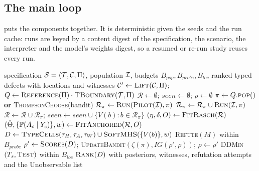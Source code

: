 \subsection{The main loop}

 puts the components together. It is deterministic given the seeds and the run cache: runs are keyed by a content digest of the specification, the scenario, the interpreter and the model's weights digest, so a resumed or re-run study reuses every run.

\begin{algorithm}[t]
\caption{\specdx}
\label{alg:specdx}
\small
\begin{algorithmic}[1]
\Require specification $\mathcal{S}=\langle\mathcal{T},\mathcal{C},\Pi\rangle$, population $\mathcal{I}$, budgets $B_{\textit{pop}},B_{\textit{probe}},B_{\textit{loc}}$
\Ensure ranked typed defects with locations and witnesses
\State $\mathcal{C}'\gets\textsc{Lift}(\mathcal{C},\Pi)$;\; $Q\gets\textsc{Reference}(\Pi)\cdot\textsc{TBoundary}(\mathcal{T},\Pi)$
\State $\mathcal{R}\gets\emptyset$;\; $\textit{seen}\gets\emptyset$;\; $\rho\gets\emptyset$ 
  \State $\pi\gets Q.\textsc{pop}()$ \textbf{or} \textsc{ThompsonChoose}(bandit)
  \State $\mathcal{R}_\pi\gets\textsc{Run}(\textsc{Pilot}(\mathcal{I}),\pi)$
    \State $\mathcal{R}_\pi\gets\mathcal{R}_\pi\cup\textsc{Run}(\mathcal{I},\pi)$ 
  \EndIf
  \State $\mathcal{R}\gets\mathcal{R}\cup\mathcal{R}_\pi$;\; $\textit{seen}\gets\textit{seen}\cup\{V(b):b\in\mathcal{R}_\pi\}$
  \State $(\eta,\delta,O)\gets\textsc{FitRasch}(\mathcal{R})$ 
  \State $(\hat\Theta,\{\mathbb{P}(A_c\mid Y_c)\},w)\gets\textsc{FitAnchored}(\mathcal{R}, O)$ 
  \State $D\gets\textsc{TypeCells}(\tau_H,\tau_A,\tau_W)\cup\textsc{SoftMHS}(\{V(b)\},w)$ 
    \State \textsc{Refute}$(M)$ within $B_{\textit{probe}}$ 
  \EndFor
  \State $\rho'\gets\textsc{Scores}(D)$;\; \textsc{UpdateBandit}$(\zeta(\pi),\textit{IG}(\rho',\rho))$;\; $\rho\gets\rho'$ 
\EndWhile
{}
  \State \textsc{DDMin}$(T_s,\textsc{Test})$ within $B_{\textit{loc}}$ 
\EndFor
\State \Return $\textsc{Rank}(D)$ with posteriors, witnesses, refutation attempts and the Unobservable list
\end{algorithmic}
\end{algorithm}

